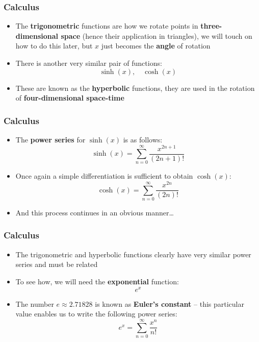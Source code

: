 \documentclass{beamer}
\begin{document}
\begin{frame}
  \frametitle{Calculus}
  \begin{itemize}
    \item<1-> The \textbf{trigonometric} functions are how we rotate points in \textbf{three-dimensional space} (hence their application in triangles), we will touch on how to do this later, but $x$ just becomes the  \textbf{angle} of rotation
    \item<2-> There is another very similar pair of functions:
      \begin{equation*}
	\sinh(x), \quad \cosh(x)
      \end{equation*}
    \item<3-> These are known as the \textbf{hyperbolic} functions, they are used in the rotation of \textbf{four-dimensional space-time}
  \end{itemize}
\end{frame}

\begin{frame}
  \frametitle{Calculus}
  \begin{itemize}
    \item<1-> The \textbf{power series} for $\sinh(x)$ is as follows:
      \begin{equation*}
	\sinh(x)=\sum_{n=0}^{\infty}\frac{x^{2n+1}}{(2n+1)!}
	\label{<+label+>}
      \end{equation*}
    \item<2-> Once again a simple differentiation is sufficient to obtain $\cosh(x)$:
      \begin{equation*}
	\cosh(x)=\sum_{n=0}^{\infty}\frac{x^{2n}}{(2n)!}
	\label{<+label+>}
      \end{equation*}
    \item<3-> And this process continues in an obvious manner\ldots
  \end{itemize}
\end{frame}

\begin{frame}
  \frametitle{Calculus}
  \begin{itemize}
    \item<1-> The trigonometric and hyperbolic functions clearly have very similar power series and must be related
    \item<2-> To see how, we will need the \textbf{exponential} function:
      \begin{equation*}
	e^x
      \end{equation*}
    \item<3-> The number $e\approx 2.71828$ is known as \textbf{Euler's constant} -- this particular value enables us to write the following power series:
      \begin{equation*}
	e^x=\sum_{n=0}^{\infty}\frac{x^n}{n!}
      \end{equation*}
  \end{itemize}
\end{frame}
\end{document}
